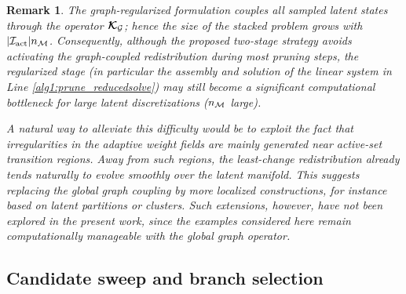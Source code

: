 \documentclass[11pt,a4paper]{article}
\newtheorem{remark}{Remark}
\begin{document}
\begin{remark}
  The graph-regularized
formulation couples all sampled latent states through the operator
\(\boldsymbol{\mathcal{K}}_{\mathcal{G}}\); hence  the size of the stacked problem grows with
\(|\mathcal{I}_{\mathrm{act}}|n_{\mathcal{M}}\). Consequently, although the proposed two-stage strategy
avoids activating the graph-coupled redistribution during most pruning
steps, the regularized stage (in particular the assembly and solution of the linear system in Line \ref{alg1:prune_reducedsolve}) may still become a significant
computational bottleneck for large latent discretizations
(\(n_{\mathcal{M}}\) large).

A natural way to alleviate this difficulty would be to exploit the fact
that irregularities in the adaptive weight fields are mainly generated
near active-set transition regions. Away from such regions, the
least-change redistribution already tends naturally to evolve smoothly
over the latent manifold. This suggests replacing the global graph
coupling by more localized constructions, for instance based on latent
partitions or clusters. Such extensions, however, have not been
explored in the present work, since the examples considered here remain
computationally manageable with the global graph operator.

%



\end{remark}








\subsection{Candidate sweep and branch selection}
\label{sec:candidatesweepbranch}
\end{document}
